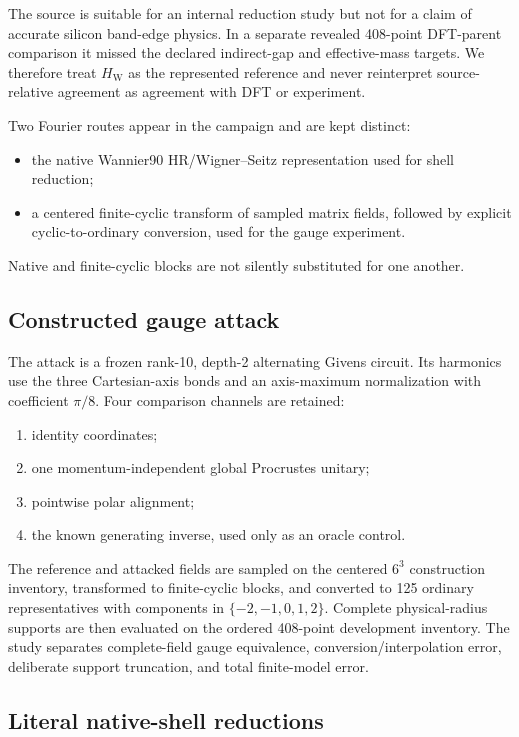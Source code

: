 \documentclass[11pt]{article}
\newcommand{\Hsrc}{H_{\mathrm W}}
\begin{document}
The source is suitable for an internal reduction study but not for a claim of accurate
silicon band-edge physics.  In a separate revealed 408-point DFT-parent comparison it
missed the declared indirect-gap and effective-mass targets.  We therefore treat
\(\Hsrc\) as the represented reference and never reinterpret source-relative agreement
as agreement with DFT or experiment.

Two Fourier routes appear in the campaign and are kept distinct:
\begin{itemize}
  \item the native Wannier90 HR/Wigner--Seitz representation used for shell reduction;
  \item a centered finite-cyclic transform of sampled matrix fields, followed by
    explicit cyclic-to-ordinary conversion, used for the gauge experiment.
\end{itemize}
Native and finite-cyclic blocks are not silently substituted for one another.

\subsection{Constructed gauge attack}

The attack is a frozen rank-10, depth-2 alternating Givens circuit.  Its harmonics use
the three Cartesian-axis bonds and an axis-maximum normalization with coefficient
\(\pi/8\).  Four comparison channels are retained:
\begin{enumerate}
  \item identity coordinates;
  \item one momentum-independent global Procrustes unitary;
  \item pointwise polar alignment;
  \item the known generating inverse, used only as an oracle control.
\end{enumerate}

The reference and attacked fields are sampled on the centered \(6^3\) construction
inventory, transformed to finite-cyclic blocks, and converted to 125 ordinary
representatives with components in \(\{-2,-1,0,1,2\}\).  Complete physical-radius
supports are then evaluated on the ordered 408-point development inventory.  The study
separates complete-field gauge equivalence, conversion/interpolation error, deliberate
support truncation, and total finite-model error.

\subsection{Literal native-shell reductions}
\end{document}
